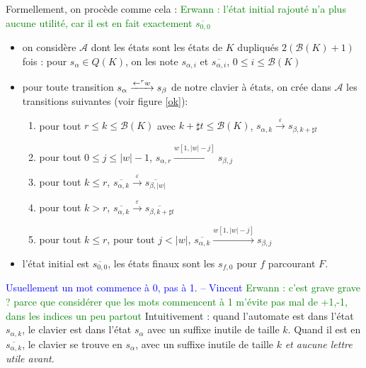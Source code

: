 \documentclass[12pt, a4paper]{article}
\renewcommand{\bar}{\overline}
\newcommand{\A}{\mathcal{A}}
\newcommand{\vincent}[1]{\textcolor{blue}{#1 -- Vincent}}
\newcommand{\erwann}[1]{\textcolor{green}{Erwann : #1}}
\begin{document}
    Formellement, on procède comme cela :
    \erwann{l'état initial rajouté n'a plus aucune utilité, car il est en fait exactement $\overline{s_{0,0}}$}
    \begin{itemize}
        \item on considère $\A$ dont les états sont les états de $K$ dupliqués $2(\mathcal{B}(K) + 1)$ fois : pour $s_\alpha \in Q(K)$, on les note $s_{\alpha, i}$ et $\overline{s_{\alpha, i}}$, $0 \leqslant i \leqslant \mathcal{B}(K)$
        \item pour toute transition $s_{\alpha} \xrightarrow{\mathord{\leftarrow}^r w} s_{\beta}$ de notre clavier à états, on crée dans $\A$ les transitions suivantes (voir figure \ref{ok}):
            \begin{enumerate}
                \item pour tout $r \leqslant k \leqslant \mathcal{B}(K)$ avec $k + \sharp t \leqslant \mathcal{B}(K)$, $s_{\alpha, k} \xrightarrow{\varepsilon} s_{\beta, k + \sharp t}$
                \item pour tout $0 \leqslant j \leqslant |w| - 1$, $s_{\alpha, r} \xrightarrow{w[1,|w|-j]} s_{\beta, j}$
                \item pour tout $k \leqslant r$, $\overline{s_{\alpha,k}} \xrightarrow{\varepsilon} \overline{s_{\beta,|w|}}$
                \item pour tout $k > r$, $\overline{s_{\alpha,k}} \xrightarrow{\varepsilon} \overline{s_{\beta,k+\sharp t}}$
                \item pour tout $k \leqslant r$, pour tout $j < |w|$, $\overline{s_{\alpha,k}} \xrightarrow{w[1,|w|-j]} s_{\beta, j}$
            \end{enumerate} 
        \item l'état initial est $\overline{s_{0,0}}$, les états finaux sont les $s_{f,0}$ pour $f$ parcourant $F$.
    \end{itemize}

    \vincent{Usuellement un mot commence à 0, pas à 1.}
    \erwann{c'est grave grave ? parce que considérer que les mots commencent à 1 m'évite pas mal de +1,-1, dans les indices un peu partout}
    Intuitivement : quand l'automate est dans l'état $s_{\alpha,k}$, le clavier est dans l'état $s_\alpha$ avec un suffixe inutile de taille $k$. Quand il est en $\overline{s_{\alpha,k}}$, le clavier se trouve en $s_\alpha$, avec un suffixe inutile de taille $k$ \emph{et aucune lettre utile avant}. 
    
\end{document}
